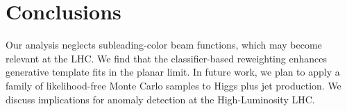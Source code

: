 \section{Conclusions}\label{sec:conclusions}

Our analysis neglects subleading-color beam functions, which may become
relevant at the LHC. We find that the classifier-based reweighting
enhances generative template fits in the planar limit. In future work,
we plan to apply a family of likelihood-free Monte Carlo samples to
Higgs plus jet production. We discuss implications for anomaly detection
at the High-Luminosity LHC.

